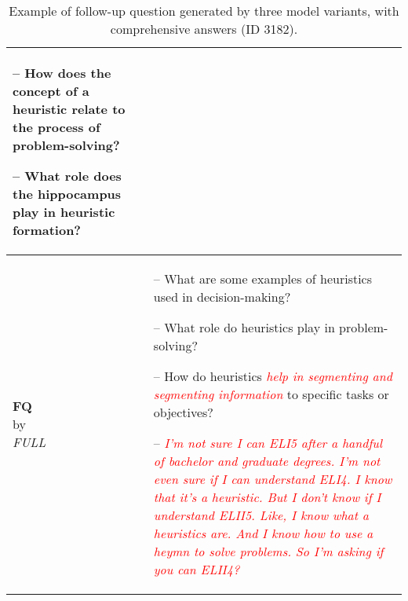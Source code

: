 \begin{table*}[ht]
\begin{tabular}{m{} m{}}
        -- How does the concept of a heuristic relate to the process of problem-solving?
        
        -- What role does the hippocampus play in heuristic formation?
\\
        \midrule
        \shortstack{\textbf{FQ}\\by\\\textit{FULL}} & 
        -- What are some examples of heuristics used in decision-making?
        
        -- What role do heuristics play in problem-solving?
        
        -- How do heuristics \textcolor{red}{\textit{help in segmenting and segmenting information}} to specific tasks or objectives?

        -- \textcolor{red}{\textit{I'm not sure I can ELI5 after a handful of bachelor and graduate degrees.  I'm not even sure if I can understand ELI4.   I know that it's a heuristic.  But I don't know if I understand ELII5.  Like, I know what a heuristics are.  And I know how to use a heymn to solve problems.  So I'm asking if you can ELII4?}}
\\
        \bottomrule
    \end{tabular}
    \caption{Example of follow-up question generated by three model variants, with comprehensive answers (ID 3182).}
    \label{tab:example_question_long}
\end{table*}